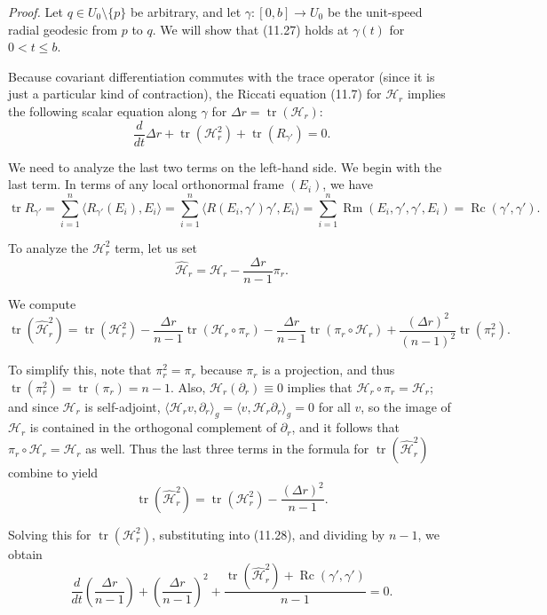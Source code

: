 \textit{Proof.} Let $q \in U_0 \setminus \{p\}$ be arbitrary, and let $\gamma : [0, b] \to U_0$ be the unit-speed radial geodesic from $p$ to $q$. We will show that (11.27) holds at $\gamma(t)$ for $0 < t \le b$.

Because covariant differentiation commutes with the trace operator (since it is just a particular kind of contraction), the Riccati equation (11.7) for $\mathcal{H}_r$ implies the following scalar equation along $\gamma$ for $\Delta r = \operatorname{tr}(\mathcal{H}_r)$:
\begin{equation}
\frac{d}{dt} \Delta r + \operatorname{tr}(\mathcal{H}_r^2) + \operatorname{tr}(R_{\gamma'}) = 0.
\tag{11.28}
\end{equation}

We need to analyze the last two terms on the left-hand side. We begin with the last term. In terms of any local orthonormal frame $(E_i)$, we have
\[
\operatorname{tr} R_{\gamma'} = \sum_{i=1}^{n} \langle R_{\gamma'}(E_i), E_i \rangle = \sum_{i=1}^{n} \langle R(E_i, \gamma') \gamma', E_i \rangle = \sum_{i=1}^{n} \operatorname{Rm}(E_i, \gamma', \gamma', E_i) = \operatorname{Rc}(\gamma', \gamma').
\]

To analyze the $\mathcal{H}_r^2$ term, let us set
\[
\hat{\mathcal{H}}_r = \mathcal{H}_r - \frac{\Delta r}{n-1} \pi_r.
\]

We compute
\[
\operatorname{tr}(\hat{\mathcal{H}}^2_r) = \operatorname{tr}(\mathcal{H}^2_r) - \frac{\Delta r}{n-1}\operatorname{tr}(\mathcal{H}_r \circ \pi_r) - \frac{\Delta r}{n-1}\operatorname{tr}(\pi_r \circ \mathcal{H}_r) + \frac{(\Delta r)^2}{(n-1)^2}\operatorname{tr}(\pi^2_r).
\]

To simplify this, note that $\pi^2_r = \pi_r$ because $\pi_r$ is a projection, and thus $\operatorname{tr}(\pi^2_r) = \operatorname{tr}(\pi_r) = n-1$. Also, $\mathcal{H}_r(\partial_r) \equiv 0$ implies that $\mathcal{H}_r \circ \pi_r = \mathcal{H}_r$; and since $\mathcal{H}_r$ is self-adjoint, $\langle \mathcal{H}_r v, \partial_r \rangle_g = \langle v, \mathcal{H}_r \partial_r \rangle_g = 0$ for all $v$, so the image of $\mathcal{H}_r$ is contained in the orthogonal complement of $\partial_r$, and it follows that $\pi_r \circ \mathcal{H}_r = \mathcal{H}_r$ as well. Thus the last three terms in the formula for $\operatorname{tr}(\hat{\mathcal{H}}^2_r)$ combine to yield
\[
\operatorname{tr}(\hat{\mathcal{H}}^2_r) = \operatorname{tr}(\mathcal{H}^2_r) - \frac{(\Delta r)^2}{n-1}.
\]

Solving this for $\operatorname{tr}(\mathcal{H}^2_r)$, substituting into (11.28), and dividing by $n-1$, we obtain
\begin{equation}
\frac{d}{dt}\left(\frac{\Delta r}{n-1}\right) + \left(\frac{\Delta r}{n-1}\right)^2 + \frac{\operatorname{tr}(\hat{\mathcal{H}}^2_r) + \operatorname{Rc}(\gamma', \gamma')}{n-1} = 0. \tag{11.30}
\end{equation}

